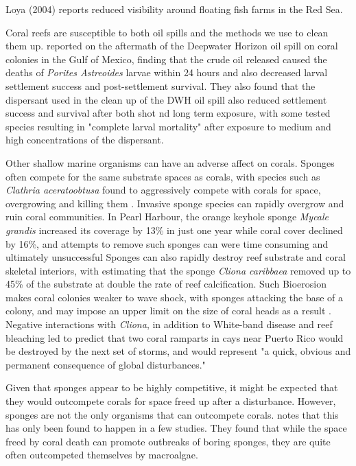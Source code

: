 \documentclass[11pt,a4paper]{article}
\begin{document}
Loya (2004) reports reduced visibility around floating fish farms in the Red Sea.

Coral reefs are susceptible to both oil spills and the methods we use to clean them up. \cite{Goodbody2013} reported on the aftermath of the Deepwater Horizon oil spill on coral colonies in the Gulf of Mexico, finding that the crude oil released caused the deaths of \textit{Porites Astreoides} larvae within 24 hours and also decreased larval settlement success and post-settlement survival. They also found that the dispersant used in the clean up of the DWH oil spill also reduced settlement success and survival after both shot nd long term exposure, with some tested species resulting in "complete larval mortality" after exposure to medium and high concentrations of the dispersant.

Other shallow marine organisms can have an adverse affect on corals. Sponges often compete for the same substrate spaces as corals, with species such as \textit{Clathria aceratoobtusa} found to aggressively compete with corals for space, overgrowing and killing them \citep{Ashok2020}. 
Invasive sponge species can rapidly overgrow and ruin coral communities. In Pearl Harbour, the orange keyhole sponge \textit{Mycale grandis} increased its coverage by 13\% in just one year while coral cover declined by 16\%, and attempts to remove such sponges can were time consuming and ultimately unsuccessful \citep{Coles2007}
 Sponges can also rapidly destroy reef substrate and coral skeletal interiors, with \cite{Acker1985} estimating that the sponge \textit{Cliona caribbaea} removed up to 45\% of the substrate at double the rate of reef calcification. Such Bioerosion makes coral colonies weaker to wave shock, with sponges attacking the base of a colony, and may impose an upper limit on the size of coral heads as a result \citep{Hein1975}.
 Negative interactions with \textit{Cliona}, in addition to White-band disease and reef bleaching led \cite{Williams1999} to predict that two coral ramparts in cays near Puerto Rico would be destroyed by the next set of storms, and would represent "a quick, obvious and permanent consequence of global disturbances." %

Given that sponges appear to be highly competitive, it might be expected that they would outcompete corals for space freed up after a disturbance. However, sponges are not the only organisms that can outcompete corals.  \cite{Gonzalez2016} notes that this has only been found to happen in a few studies. They found that while the space freed by coral death can promote outbreaks of boring sponges, they are quite often outcompeted themselves by macroalgae.
\end{document}
